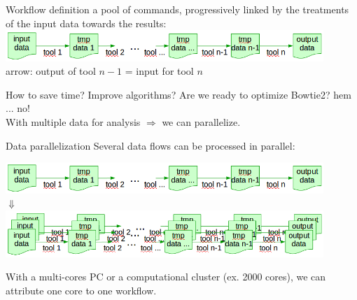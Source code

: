 \begin{frame}{Workflow definition}
 a pool of commands, progressively linked by the treatments of the input data towards the results:\\
    \includegraphics[width=12cm]{03_workflow/images/FAIR_smk_data_wf.png}\\
   arrow: output of tool $n-1$ = input for tool $n$
\begin{block}{How to save time?}
Improve algorithms? Are we ready to optimize Bowtie2? hem ... no!\\
With multiple data for analysis $\Rightarrow$ we can parallelize.
\end{block}
\end{frame}
\begin{frame}{Data parallelization}
  Several data flows can be processed in parallel:
  \begin{center}
     \includegraphics[width=12cm]{03_workflow/images/FAIR_smk_data_wf.png}\\
     $\Downarrow$\\
     \includegraphics[width=12cm]{03_workflow/images/FAIR_smk_n_data_wf.png}
  \end{center}
  With a multi-cores PC or a computational cluster (ex. 2000 cores), we can attribute one core to one workflow.
\end{frame}
